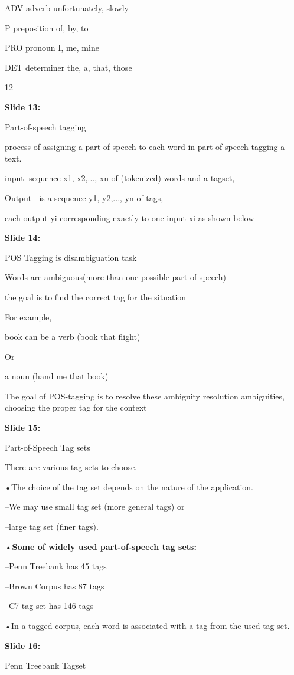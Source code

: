 \documentclass[11pt,a4paper]{article}
\begin{document}
ADV	adverb		unfortunately, slowly

P		preposition	of, by, to

PRO		pronoun		I, me, mine

DET		determiner	the, a, that, those

12

\textbf{Slide 13:}

Part-of-speech tagging

process of assigning a part-of-speech to each word in part-of-speech tagging a text.

input sequence x1, x2,..., xn of (tokenized) words and a tagset,

Output  is a sequence y1, y2,..., yn of tags,

each output yi corresponding exactly to one input xi as shown   below

\textbf{Slide 14:}

POS Tagging is disambiguation task

Words are ambiguous(more than one possible part-of-speech)

the goal is to find the correct tag for the situation

For example,

book can be a verb (book that flight)

Or

a noun (hand me that book)

The goal of POS-tagging is to resolve these ambiguity resolution ambiguities, choosing the proper tag for the context

\textbf{Slide 15:}

Part-of-Speech Tag sets

There are various tag sets to choose.

•The choice of the tag set depends on the nature of the application.

–We may use small tag set (more general tags) or

–large tag set (finer tags).

\textbf{•Some of widely used part-of-speech tag sets:} 

–Penn Treebank has 45 tags

–Brown Corpus has 87 tags

–C7 tag set has 146 tags

•In a tagged corpus, each word is associated with a tag from the used tag set.

\textbf{Slide 16:}

Penn Treebank Tagset
\end{document}
